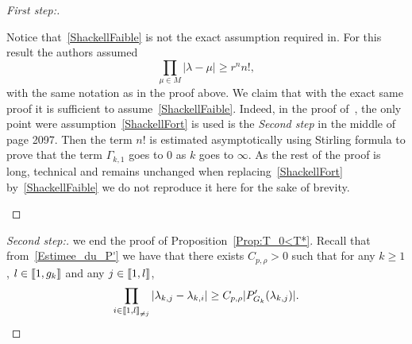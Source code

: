 \documentclass[AHL,Unicode,longabstracts]{cedram}
\newenvironment{step}[1]{\begin{proof}[#1]}{\let\qed\relax\end{proof}}
\newcommand{\llbracket}{\mathopen{[\mkern -2.7mu[}}
\newcommand{\rrbracket}{\mathclose{]\mkern -2.7mu]}}
\newcommand{\inter}[2]{\llbracket #1,#2 \rrbracket}
\newcommand{\interexclu}[3]{\llbracket #1,#2\rrbracket_{\neq #3}}
\newcommand{\n}{g}
\begin{document}
\begin{proofc}
\begin{step}{First step:}
\begin{rema}
Notice that~\eqref{ShackellFaible} is not the exact assumption required in\linebreak\cite[Theorem~3.8]{AmmarKhodjaBenabdallahGonzalez-BurgosdeTeresa:2014}. For this result the authors assumed
\begin{equation}\label{ShackellFort}
\prod_{\mu\in M} |\lambda- \mu| \geq r^n n!,
\end{equation}
with the same notation as in the proof above. We claim that with the exact same proof it is sufficient to assume~\eqref{ShackellFaible}. Indeed, in the proof of~\cite[Theorem~3.8]{AmmarKhodjaBenabdallahGonzalez-BurgosdeTeresa:2014}, the only point were assumption~\eqref{ShackellFort} is used is the \emph{Second step} in the middle of page 2097. Then the term $n!$ is estimated asymptotically using Stirling formula to prove that the term $\Gamma_{k,1}$ goes to $0$ as $k$ goes to $\infty$. As the rest of the proof is long, technical and remains unchanged when replacing~\eqref{ShackellFort} by~\eqref{ShackellFaible} we do not reproduce it here for the sake of brevity.
\end{rema}
\end{step}

\begin{step}{Second step:}
we end the proof of Proposition~\ref{Prop:T_0<T*}. Recall that from~\eqref{Estimee_du_P'} we have that there exists $C_{p, \rho}>0$ such that for any $k\geq 1$, $l \in \inter{1}{\n_k}$ and any $j \in \inter{1}{l}$,
\begin{equation*}
\prod_{i\in \interexclu{1}{l}{j}} | \lambda_{k,j} - \lambda_{k,i}| \geq C_{p,\rho} |P_{G_k}' (\lambda_{k,j}) |.
\end{equation*}



\end{step}
\end{proofc}
\end{document}
